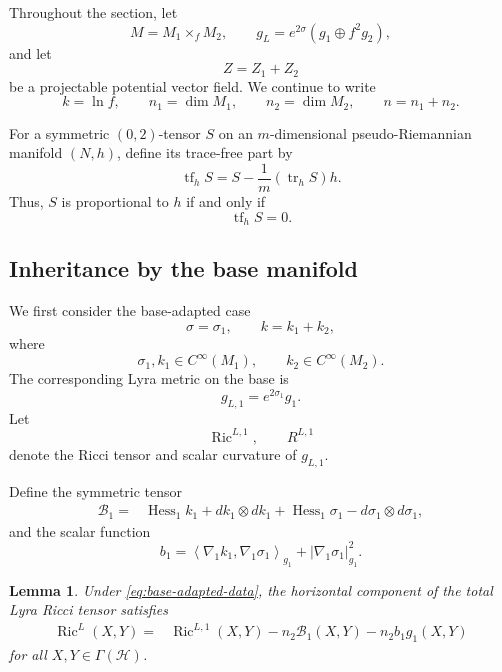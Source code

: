 \documentclass[a4paper,11pt]{article}
\theoremstyle{plain}
\newtheorem{lemma}{Lemma}[section]
\numberwithin{equation}{section}
\begin{document}
Throughout the section, let
\[
M=M_{1}\times_{f}M_{2},
\qquad
g_{L}=e^{2\sigma}
\left(
g_{1}\oplus f^{2}g_{2}
\right),
\]
and let
\[
Z=Z_{1}+Z_{2}
\]
be a projectable potential vector field. We continue to write
\[
k=\ln f,
\qquad
n_{1}=\dim M_{1},
\qquad
n_{2}=\dim M_{2},
\qquad
n=n_{1}+n_{2}.
\]

For a symmetric \((0,2)\)-tensor \(S\) on an \(m\)-dimensional
pseudo-Riemannian manifold \((N,h)\), define its trace-free part by
\begin{equation}
	\operatorname{tf}_{h}S
	=
	S
	-
	\frac{1}{m}
	\left(
	\operatorname{tr}_{h}S
	\right)h.
	\label{eq:trace-free-part}
\end{equation}
Thus, \(S\) is proportional to \(h\) if and only if
\[
\operatorname{tf}_{h}S=0.
\]

\subsection{Inheritance by the base manifold}
\label{subsec:base-inheritance}

We first consider the base-adapted case
\begin{equation}
	\sigma=\sigma_{1},
	\qquad
	k=k_{1}+k_{2},
	\label{eq:base-adapted-data}
\end{equation}
where
\[
\sigma_{1},k_{1}\in C^{\infty}(M_{1}),
\qquad
k_{2}\in C^{\infty}(M_{2}).
\]
The corresponding Lyra metric on the base is
\begin{equation}
	g_{L,1}
	=
	e^{2\sigma_{1}}g_{1}.
	\label{eq:base-lyra-metric}
\end{equation}
Let
\[
\operatorname{Ric}^{L,1},
\qquad
R^{L,1}
\]
denote the Ricci tensor and scalar curvature of
\(g_{L,1}\).

Define the symmetric tensor
\begin{align}
	\mathcal B_{1}
	={}&
	\operatorname{Hess}_{1}k_{1}
	+
	dk_{1}\otimes dk_{1}
	+
	\operatorname{Hess}_{1}\sigma_{1}
	-
	d\sigma_{1}\otimes d\sigma_{1},
	\label{eq:base-inheritance-tensor}
\end{align}
and the scalar function
\begin{equation}
	b_{1}
	=
	\left\langle
	\nabla_{1}k_{1},
	\nabla_{1}\sigma_{1}
	\right\rangle_{g_{1}}
	+
	\left\lvert
	\nabla_{1}\sigma_{1}
	\right\rvert_{g_{1}}^{2}.
	\label{eq:base-inheritance-scalar}
\end{equation}

\begin{lemma}
	\label{lem:base-lyra-ricci-splitting}
	Under \eqref{eq:base-adapted-data}, the horizontal component of
	the total Lyra Ricci tensor satisfies
	\begin{align}
		\operatorname{Ric}^{L}(X,Y)
		={}&
		\operatorname{Ric}^{L,1}(X,Y)
		-
		n_{2}\mathcal B_{1}(X,Y)
		-
		n_{2}b_{1}g_{1}(X,Y)
		\label{eq:base-lyra-ricci-splitting}
	\end{align}
	for all \(X,Y\in\Gamma(\mathcal H)\).
\end{lemma}
\end{document}
